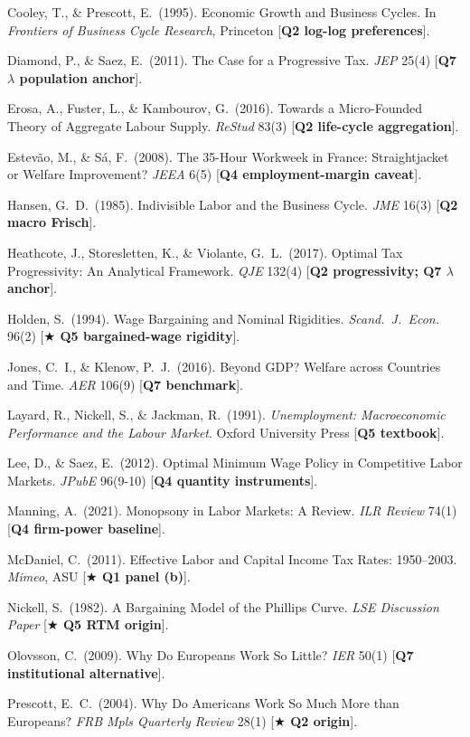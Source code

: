 \documentclass[9pt,a4paper]{extarticle}
\begin{document}
Cooley, T., \& Prescott, E.\ (1995). Economic Growth and Business
Cycles. In \emph{Frontiers of Business Cycle Research}, Princeton
[\textbf{Q2 log-log preferences}].

Diamond, P., \& Saez, E.\ (2011). The Case for a Progressive Tax.
\emph{JEP} 25(4) [\textbf{Q7 $\lambda$ population anchor}].

Erosa, A., Fuster, L., \& Kambourov, G.\ (2016). Towards a Micro-Founded
Theory of Aggregate Labour Supply. \emph{ReStud} 83(3)
[\textbf{Q2 life-cycle aggregation}].

Estev\~ao, M., \& S\'a, F.\ (2008). The 35-Hour Workweek in France:
Straightjacket or Welfare Improvement? \emph{JEEA} 6(5)
[\textbf{Q4 employment-margin caveat}].

Hansen, G.\ D.\ (1985). Indivisible Labor and the Business Cycle.
\emph{JME} 16(3) [\textbf{Q2 macro Frisch}].

Heathcote, J., Storesletten, K., \& Violante, G.\ L.\ (2017). Optimal
Tax Progressivity: An Analytical Framework. \emph{QJE} 132(4)
[\textbf{Q2 progressivity; Q7 $\lambda$ anchor}].

Holden, S.\ (1994). Wage Bargaining and Nominal Rigidities.
\emph{Scand.\ J.\ Econ.} 96(2) [\textbf{$\bigstar$ Q5 bargained-wage
rigidity}].

Jones, C.\ I., \& Klenow, P.\ J.\ (2016). Beyond GDP? Welfare across
Countries and Time. \emph{AER} 106(9) [\textbf{Q7 benchmark}].

Layard, R., Nickell, S., \& Jackman, R.\ (1991). \emph{Unemployment:
Macroeconomic Performance and the Labour Market}. Oxford University
Press [\textbf{Q5 textbook}].

Lee, D., \& Saez, E.\ (2012). Optimal Minimum Wage Policy in Competitive
Labor Markets. \emph{JPubE} 96(9-10) [\textbf{Q4 quantity instruments}].

Manning, A.\ (2021). Monopsony in Labor Markets: A Review.
\emph{ILR Review} 74(1) [\textbf{Q4 firm-power baseline}].

McDaniel, C.\ (2011). Effective Labor and Capital Income Tax Rates:
1950--2003. \emph{Mimeo}, ASU [\textbf{$\bigstar$ Q1 panel (b)}].

Nickell, S.\ (1982). A Bargaining Model of the Phillips Curve.
\emph{LSE Discussion Paper} [\textbf{$\bigstar$ Q5 RTM origin}].

Olovsson, C.\ (2009). Why Do Europeans Work So Little?
\emph{IER} 50(1) [\textbf{Q7 institutional alternative}].

Prescott, E.\ C.\ (2004). Why Do Americans Work So Much More than
Europeans? \emph{FRB Mpls Quarterly Review} 28(1)
[\textbf{$\bigstar$ Q2 origin}].
\end{document}
